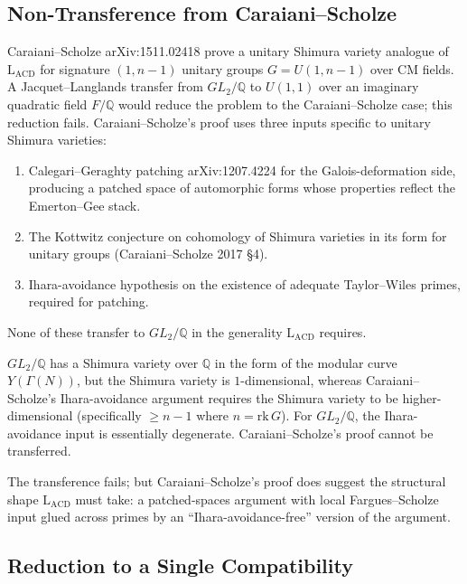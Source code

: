 \subsection{Non-Transference from Caraiani--Scholze}
\label{v4-arith:acd:obstruction-5}

Caraiani--Scholze arXiv:1511.02418 prove a unitary Shimura variety
analogue of \(\mathrm{L}_{\mathrm{ACD}}\) for signature \((1,n-1)\)
unitary groups \(G=U(1,n-1)\) over CM fields. A Jacquet--Langlands
transfer from \(GL_{2}/\mathbb{Q}\) to \(U(1,1)\) over an imaginary
quadratic field \(F/\mathbb{Q}\) would reduce the problem to the
Caraiani--Scholze case; this reduction fails. Caraiani--Scholze's proof
uses three inputs specific to unitary Shimura varieties:
\begin{enumerate}
\item Calegari--Geraghty patching arXiv:1207.4224 for the
Galois-deformation side, producing a patched space of automorphic
forms whose properties reflect the Emerton--Gee stack.
\item The Kottwitz conjecture on cohomology of Shimura varieties in
its form for unitary groups (Caraiani--Scholze 2017 \S4).
\item Ihara-avoidance hypothesis on the existence of adequate
Taylor--Wiles primes, required for patching.
\end{enumerate}

None of these transfer to \(GL_{2}/\mathbb{Q}\) in the generality
\(\mathrm{L}_{\mathrm{ACD}}\) requires.

\begin{observation}
\label{v4-arith:acd:obs:non-transference-CS}
\(GL_{2}/\mathbb{Q}\) has a Shimura variety over \(\mathbb{Q}\) in the
form of the modular curve \(Y(\Gamma(N))\), but the Shimura variety is
\(1\)-dimensional, whereas Caraiani--Scholze's Ihara-avoidance argument
requires the Shimura variety to be higher-dimensional (specifically
\(\geq n-1\) where \(n=\mathrm{rk}\,G\)). For \(GL_{2}/\mathbb{Q}\), the
Ihara-avoidance input is essentially degenerate. Caraiani--Scholze's
proof cannot be transferred.
\end{observation}

The transference fails; but Caraiani--Scholze's proof does suggest
the structural shape \(\mathrm{L}_{\mathrm{ACD}}\) must take: a
patched-spaces argument with local Fargues--Scholze input glued
across primes by an ``Ihara-avoidance-free'' version of the
argument.

\subsection{Reduction to a Single Compatibility}
\label{v4-arith:acd:obstruction-6}

